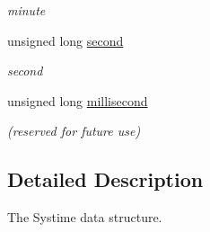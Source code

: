 \begin{DoxyCompactItemize}
\begin{DoxyCompactList}\small\item\em minute \item\end{DoxyCompactList}\item 
\hypertarget{structt__datetime_afa92172dd1ad54a4a7dc6f00a578552c}{
unsigned long \hyperlink{structt__datetime_afa92172dd1ad54a4a7dc6f00a578552c}{second}}
\label{structt__datetime_afa92172dd1ad54a4a7dc6f00a578552c}

\begin{DoxyCompactList}\small\item\em second \item\end{DoxyCompactList}\item 
\hypertarget{structt__datetime_acdc1eb3b28e0469606da21999339785c}{
unsigned long \hyperlink{structt__datetime_acdc1eb3b28e0469606da21999339785c}{millisecond}}
\label{structt__datetime_acdc1eb3b28e0469606da21999339785c}

\begin{DoxyCompactList}\small\item\em (reserved for future use) \item\end{DoxyCompactList}\end{DoxyCompactItemize}


\subsection{Detailed Description}
The Systime data structure. 
